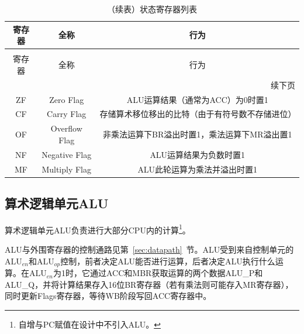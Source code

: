 \documentclass[lang=cn,a4paper,newtx]{elegantpaper}
\begin{document}
\begin{longtable}{c c c}
  \caption{状态寄存器列表} \label{tab:CPU:status} \\
  \toprule
  寄存器 & 全称 & 行为 \\ 
  \midrule
  \endfirsthead

  \caption[]{（续表）状态寄存器列表} \\
  \toprule
  寄存器 & 全称 & 行为\\
  \midrule
  \endhead

  \midrule
  \multicolumn{3}{r}{续下页} \\
  \midrule
  \endfoot

  \bottomrule
  \endlastfoot

  ZF   & Zero Flag             & ALU运算结果（通常为ACC）为0时置1\\
  CF  & Carry Flag     & 存储算术移位移出的比特（由于有符号数不存储进位）\\
  OF  & Overflow Flag &  非乘法运算下BR溢出时置1，乘法运算下MR溢出置1\\
  NF  & Negative Flag &  ALU运算结果为负数时置1\\
  MF & Multiply Flag & ALU此轮运算为乘法并溢出时置1\\
\end{longtable}
\subsection{算术逻辑单元ALU}
算术逻辑单元ALU负责进行大部分CPU内的计算\footnote{自增与PC赋值在设计中不引入ALU。}。

ALU与外围寄存器的控制通路见第~\ref{sec:datapath}~节。ALU受到来自控制单元的$\text{ALU}_{en}$和$\text{ALU}_{op}$控制，前者决定ALU能否进行运算，后者决定ALU执行什么运算。在$\text{ALU}_{en}$为1时，它通过ACC和MBR获取运算的两个数据ALU\_P和ALU\_Q，并将计算结果存入16位BR寄存器（若有乘法则可能存入MR寄存器），同时更新Flags寄存器，等待WB阶段写回ACC寄存器中。
\end{document}
